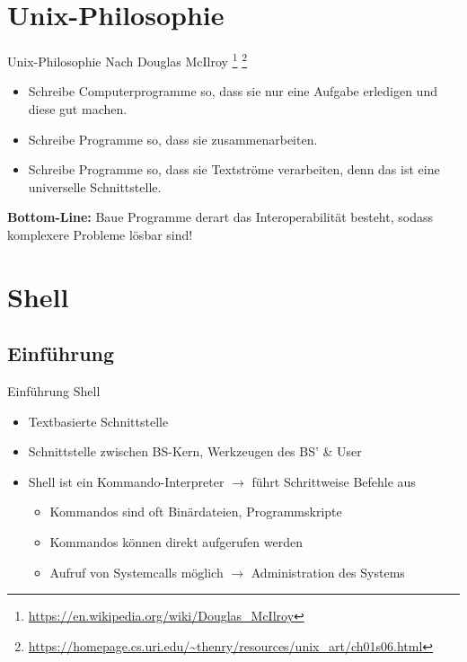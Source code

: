 \documentclass[xcolor=dvipsnames,aspectratio=169]{beamer}
\begin{document}
\section{Unix-Philosophie}

\begin{frame}{}
\end{frame}

\begin{frame}{Unix-Philosophie}
	Nach Douglas McIlroy \footnote{\url{https://en.wikipedia.org/wiki/Douglas_McIlroy}} \footnote{\url{https://homepage.cs.uri.edu/~thenry/resources/unix_art/ch01s06.html}}
	\begin{itemize}
		\item Schreibe Computerprogramme so, dass sie nur eine Aufgabe erledigen und diese gut machen.
		\item Schreibe Programme so, dass sie zusammenarbeiten.
		\item Schreibe Programme so, dass sie Textströme verarbeiten, denn das ist eine universelle Schnittstelle.
	\end{itemize}
	\textbf{Bottom-Line:} Baue Programme derart das Interoperabilität besteht, sodass komplexere Probleme lösbar sind!
\end{frame}

\section{Shell}

\begin{frame}{}
\end{frame}

\subsection{Einführung}
\begin{frame}{Einführung Shell}
	\begin{itemize}
		\item Textbasierte Schnittstelle
		\item Schnittstelle zwischen BS-Kern, Werkzeugen des BS' \& User
		\item Shell ist ein Kommando-Interpreter $\rightarrow$ führt Schrittweise Befehle aus
		\begin{itemize}
			\item Kommandos sind oft Binärdateien, Programmskripte
			\item Kommandos können direkt aufgerufen werden
			\item Aufruf von Systemcalls möglich $\rightarrow$ Administration des Systems
		\end{itemize}
	\end{itemize}
\end{frame}
\end{document}
